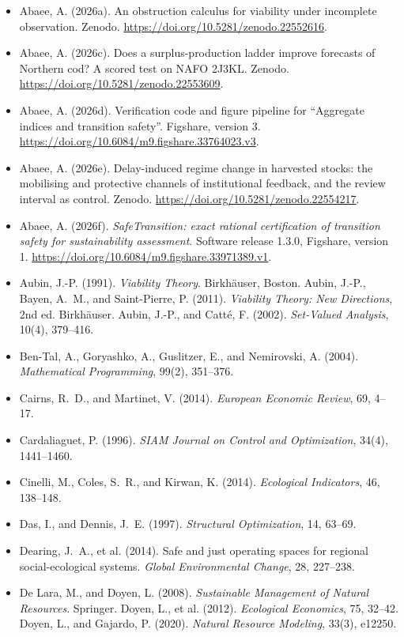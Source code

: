 \documentclass[preprint,11pt,authoryear]{elsarticle}
\theoremstyle{remark}
\begin{document}
\begin{itemize}[leftmargin=1.5em,itemsep=1pt]
\item Abaee, A. (2026a). An obstruction calculus for viability under incomplete observation. Zenodo. \url{https://doi.org/10.5281/zenodo.22552616}.
\item Abaee, A. (2026c). Does a surplus-production ladder improve forecasts of Northern cod? A scored test on NAFO 2J3KL. Zenodo. \url{https://doi.org/10.5281/zenodo.22553609}.
\item Abaee, A. (2026d). Verification code and figure pipeline for ``Aggregate indices and transition safety''. Figshare, version 3. \url{https://doi.org/10.6084/m9.figshare.33764023.v3}.
\item Abaee, A. (2026e). Delay-induced regime change in harvested stocks: the mobilising and protective channels of institutional feedback, and the review interval as control. Zenodo. \url{https://doi.org/10.5281/zenodo.22554217}.
\item Abaee, A. (2026f). \emph{SafeTransition: exact rational certification of transition safety for sustainability assessment}. Software release 1.3.0, Figshare, version 1. \url{https://doi.org/10.6084/m9.figshare.33971389.v1}.
\item Aubin, J.-P. (1991). \emph{Viability Theory}. Birkh\"auser, Boston. Aubin, J.-P., Bayen, A.~M., and Saint-Pierre, P. (2011). \emph{Viability Theory: New Directions}, 2nd ed. Birkh\"auser. Aubin, J.-P., and Catt\'e, F. (2002). \emph{Set-Valued Analysis}, 10(4), 379--416.
\item Ben-Tal, A., Goryashko, A., Guslitzer, E., and Nemirovski, A. (2004). \emph{Mathematical Programming}, 99(2), 351--376.
\item Cairns, R.~D., and Martinet, V. (2014). \emph{European Economic Review}, 69, 4--17.
\item Cardaliaguet, P. (1996). \emph{SIAM Journal on Control and Optimization}, 34(4), 1441--1460.
\item Cinelli, M., Coles, S.~R., and Kirwan, K. (2014). \emph{Ecological Indicators}, 46, 138--148.
\item Das, I., and Dennis, J.~E. (1997). \emph{Structural Optimization}, 14, 63--69.
\item Dearing, J.~A., et al. (2014). Safe and just operating spaces for regional social-ecological systems. \emph{Global Environmental Change}, 28, 227--238.
\item De Lara, M., and Doyen, L. (2008). \emph{Sustainable Management of Natural Resources}. Springer. Doyen, L., et al. (2012). \emph{Ecological Economics}, 75, 32--42. Doyen, L., and Gajardo, P. (2020). \emph{Natural Resource Modeling}, 33(3), e12250.

\end{itemize}
\end{document}

